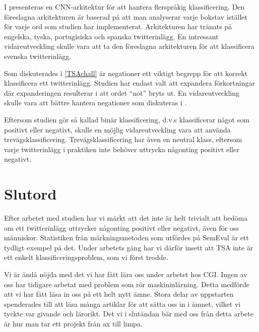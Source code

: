 \documentclass{kaumasters} %
\begin{document}
I \cite{slut:001} presenteras en CNN-arkitektur för att hantera flerspråkig klassificering. Den föreslagna arkitekturen är baserad på att man analyserar varje bokstav istället för varje ord som studien har implementerat. Arkitekturen har tränats på engelska, tyska, portugisiska och spanska twitterinlägg. En intressant vidareutveckling skulle vara att ta den föreslagna arkitekturen för att klassificera svenska twitterinlägg.

Som diskuterades i \ref{TSAchall} är negationer ett viktigt begrepp för att korrekt klassificera ett twitterinlägg. Studien har endast valt att expandera förkortningar där expanderingen resulterar i att ordet “not” bryts ut. En vidareutveckling skulle vara att bättre hantera negationer som diskuteras i \cite{TSAsurvey, effrosynidis2017comparison}.

Eftersom studien gör så kallad binär klassificering, d.v.s klassificerar något som positivt eller negativt, skulle en möjlig vidareutveckling vara att använda trevägsklassificering. Trevägsklassificering har även en neutral klass, eftersom varje twitterinlägg i praktiken inte behöver uttrycka någonting positivt eller negativt. 
\section{Slutord}
Efter arbetet med studien har vi märkt att det inte är helt trivialt att bedöma om ett twitterinlägg uttrycker någonting positivt eller negativt, även för oss människor. Statistiken från märkningsmetoden som utfördes på SemEval är ett tydligt exempel på det. Under arbetets gång har vi därför  insett att TSA inte är ett enkelt klassificeringsproblem, som vi först trodde. 

Vi är ändå nöjda med det vi har fått lära oss under arbetet hos CGI. Ingen av oss har tidigare arbetat med problem som rör maskininlärning. Detta medförde att vi har fått läsa in 
oss på ett helt nytt ämne. Stora delar av uppstarten spenderades till att läsa många artiklar för att sätta oss in i ämnet, vilket vi tyckte var givande och lärorikt. Det vi i slutändan bär med oss från detta arbete är hur man tar ett projekt från ax till limpa. 

 



\restoregeometry%
\end{document}
